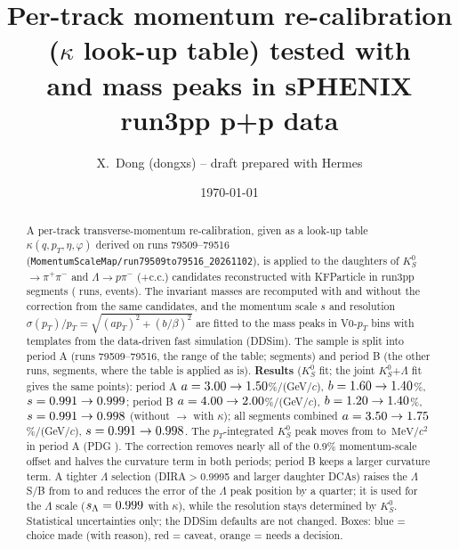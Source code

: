 \documentclass[11pt,a4paper]{article}
\title{Per-track momentum re-calibration ($\kappa$ look-up table) tested with\\
\Ks{} and \La{} mass peaks in sPHENIX run3pp p+p data}
\author{X.~Dong (dongxs) \quad -- \quad draft prepared with Hermes}
\date{\today}
\newcommand{\fpath}[1]{\nolinkurl{#1}}
\newcommand{\pt}{\ensuremath{p_T}}
\newcommand{\Ks}{\ensuremath{K^0_S}}
\newcommand{\La}{\ensuremath{\Lambda}}
\newcommand{\mevcc}{\ensuremath{\,\mathrm{MeV}/c^2}}
\begin{document}
\maketitle

\begin{abstract}
\noindent
A per-track transverse-momentum re-calibration, given as a look-up table $\kappa(q,\pt,\eta,\varphi)$ derived on runs
79509--79516 (\fpath{MomentumScaleMap/run79509to79516_20261102}), is applied to the daughters of \Ks$\to\pi^+\pi^-$ and
\La$\to p\pi^-$ (+c.c.) candidates reconstructed with KFParticle in \PerAllSeg{} run3pp segments (\NRuns{} runs,
\PerAllEv{} events). The invariant masses are recomputed with and without the correction from the same candidates,
and the momentum scale $s$ and resolution $\sigma(\pt)/\pt=\sqrt{(a\pt)^2+(b/\beta)^2}$ are fitted to the mass peaks in
V0-\pt{} bins with templates from the data-driven fast simulation (DDSim). The sample is split into period A (runs
79509--79516, the range of the table; \PerASeg{} segments) and period B (the other \NRunsB{} runs, \PerBSeg{} segments,
where the table is applied as is). \textbf{Results} (\Ks{} fit; the joint \Ks+\La{} fit gives the same points):
period A $a=3.00\to1.50$\%/(GeV/$c$), $b=1.60\to1.40$\%, $s=0.991\to0.999$;
period B $a=4.00\to2.00$\%/(GeV/$c$), $b=1.20\to1.40$\%, $s=0.991\to0.998$
(without $\to$ with $\kappa$); all segments combined $a=3.50\to1.75$\%/(GeV/$c$), $s=0.991\to0.998$. The \pt-integrated \Ks{} peak moves from \PerARawKsGM{} to \PerAKapKsGM\mevcc{} in period A
(PDG \PdgKs). The correction removes nearly all of the 0.9\% momentum-scale offset and halves the curvature term in both
periods; period B keeps a larger curvature term. A tighter \La{} selection (DIRA$>$0.9995 and larger daughter DCAs) raises the \La{} S/B from \PerAllKapLpQaSB{} to \PerAllKapLpTiSB{} and reduces the error of the \La{} peak position by a quarter; it is used for the \La{} scale ($s_\Lambda=0.999$ with $\kappa$), while the resolution stays determined by \Ks. Statistical uncertainties only; the DDSim defaults are not changed. \SampleStatus{}
Boxes: blue = choice made (with reason), red = caveat, orange = needs a decision.
\end{abstract}

\tableofcontents
\clearpage













\end{document}
